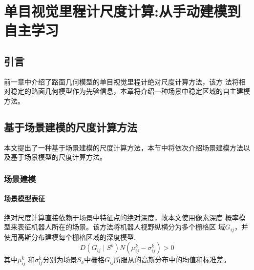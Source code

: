 \chapter{单目视觉里程计尺度计算:从手动建模到自主学习}
\section{引言}
前一章中介绍了路面几何模型的单目视觉里程计绝对尺度计算方法，该方 法将相对稳定的路面几何模型作为先验信息，本章将介绍一种场景中稳定区域的自主建模方法。
\section{基于场景建模的尺度计算方法} 
本文提出了一种基于场景建模的尺度计算方法，本节中将依次介绍场景建模方法以及基于场景模型的尺度计算方法。
\subsection{场景建模} 
\subsubsection{场景模型表征}
绝对尺度计算直接依赖于场景中特征点的绝对深度，故本文使用像素深度 概率模型来表征机器人所在的场景。该方法将机器人视野纵横分为多个栅格区 域$G_{ij}$，并使用高斯分布建模每个栅格区域的深度模型.
\begin{equation}
D(G_{ij} \mid S^k) N(\mu_{ij}^{k}-\sigma_{ij}^{k})>0
\end{equation}
其中$\mu_{ij}^{k}$ 和$\sigma_{ij}^{k}$分别为场景$S_k$中栅格$G_{ij}$所服从的高斯分布中的均值和标准差。

